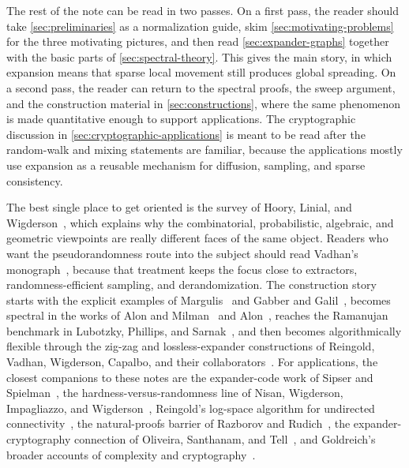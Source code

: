  The rest of the note can be read in two passes. On a first pass, the reader should take \cref{sec:preliminaries} as a normalization guide, skim \cref{sec:motivating-problems} for the three motivating pictures, and then read \cref{sec:expander-graphs} together with the basic parts of \cref{sec:spectral-theory}. This gives the main story, in which expansion means that sparse local movement still produces global spreading. On a second pass, the reader can return to the spectral proofs, the sweep argument, and the construction material in \cref{sec:constructions}, where the same phenomenon is made quantitative enough to support applications. The cryptographic discussion in \cref{sec:cryptographic-applications} is meant to be read after the random-walk and mixing statements are familiar, because the applications mostly use expansion as a reusable mechanism for diffusion, sampling, and sparse consistency.

 The best single place to get oriented is the survey of Hoory, Linial, and Wigderson~\cite{HLW2006}, which explains why the combinatorial, probabilistic, algebraic, and geometric viewpoints are really different faces of the same object. Readers who want the pseudorandomness route into the subject should read Vadhan's monograph~\cite{Vad2012}, because that treatment keeps the focus close to extractors, randomness-efficient sampling, and derandomization. The construction story starts with the explicit examples of Margulis~\cite{Mar1973} and Gabber and Galil~\cite{GG1981}, becomes spectral in the works of Alon and Milman~\cite{AM1985} and Alon~\cite{Alo1986}, reaches the Ramanujan benchmark in Lubotzky, Phillips, and Sarnak~\cite{LPS1988}, and then becomes algorithmically flexible through the zig-zag and lossless-expander constructions of Reingold, Vadhan, Wigderson, Capalbo, and their collaborators~\cite{RVW2002,CRVW2002}. For applications, the closest companions to these notes are the expander-code work of Sipser and Spielman~\cite{FOCS:SipSpi94}, the hardness-versus-randomness line of Nisan, Wigderson, Impagliazzo, and Wigderson~\cite{FOCS:NisWig88,IW1997}, Reingold's log-space algorithm for undirected connectivity~\cite{Rei2008}, the natural-proofs barrier of Razborov and Rudich~\cite{RR1997}, the expander-cryptography connection of Oliveira, Santhanam, and Tell~\cite{ITCS:OliSanTel19,OST2022}, and Goldreich's broader accounts of complexity and cryptography~\cite{Gol2008,C:Goldreich97,Goldreich04,Goldreich01}.
